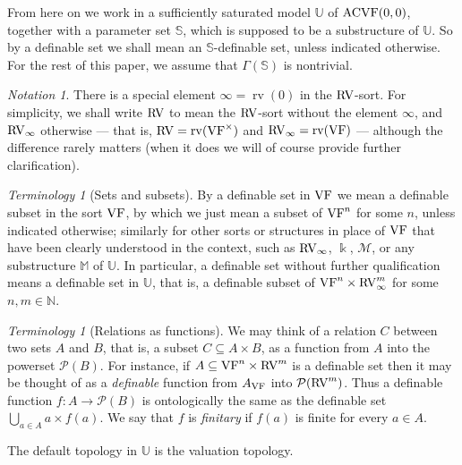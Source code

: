 \documentclass[12pt]{amsart}
\newcommand{\memph}[1]{{\color{magenta}\emph{#1}}}
\theoremstyle{plain}
\theoremstyle{definition}
\theoremstyle{remark}
\newtheorem{ter}[thm]{Terminology}
\newtheorem{nota}[thm]{Notation}
\numberwithin{equation}{section}
\theoremstyle{plain}
\newcommand{\VF}{\textup{VF}}
\newcommand{\ACVF}{\textup{ACVF}}
\newcommand{\RV}{\textup{RV}}
\newcommand{\MM}{\mdl M}
\DeclareMathOperator{\K}{\mathds{k}}
\newcommand{\N}{\mathds{N}}
\newcommand{\0}{\emptyset}
\newcommand{\mdl}[1]{\mathcal{#1}}  %
\newcommand{\bb}[1]{\mathbb{#1}}
\newcommand{\fun}{\longrightarrow}
\newcommand{\sub}{\subseteq}
\DeclareMathOperator{\rv}{rv}
\begin{document}
From here on we work in a sufficiently saturated model $\bb U$ of $\ACVF(0,0)$, together with a parameter  set $\mathbb{S}$, which is supposed to be a substructure of $\bb U$. So by a definable set  we shall mean an $\bb S$-definable set, unless indicated otherwise. For the rest of this paper, we assume that $\Gamma(\mathbb S)$ is nontrivial.

\begin{nota}
There is a special element $\infty = \rv(0)$ in the $\RV$-sort. For simplicity, we shall write $\RV$ to mean the $\RV$-sort without the element $\infty$, and $\RV_\infty$ otherwise --- that is, $\RV = \rv(\VF^\times)$ and $\RV_\infty = \rv(\VF)$ --- although the difference rarely matters (when it does we will of course provide further clarification).
\end{nota}

\begin{ter}[Sets and subsets]\label{nota:sub}
By a definable set in $\VF$ we mean a definable subset in the sort $\VF$, by which we just mean a subset of $\VF^n$ for some $n$, unless indicated otherwise; similarly for other sorts or structures  in place of $\VF$ that have been clearly understood in the context, such as $\RV_\infty$, $\K$, $\MM$, or any substructure $\bb M$ of $\bb U$. In particular,  a definable set without further qualification means a definable set in $\bb U$, that is, a  definable subset of $\VF^n \times \RV^m_\infty$ for some $n, m \in \N$.
\end{ter}

\begin{ter}[Relations as functions]
We may think of a relation $C$ between two sets $A$ and $B$, that is, a subset $C \sub A \times B$, as a function from $A$ into the powerset $\mdl P(B)$. For instance, if $A \sub \VF^n \times \RV^m$ is a definable set then it may be thought of as a \memph{definable} function from $A_{\VF}$ into  $\mdl P(\RV^m)$. Thus a definable function $f : A \fun \mdl P(B)$ is ontologically the same as the definable set $\bigcup_{a \in A} a \times f(a)$. We say that $f$ is \memph{finitary} if $f(a)$ is finite for every $a \in A$.
\end{ter}

The default topology in $\bb U$ is the valuation topology.
\end{document}
